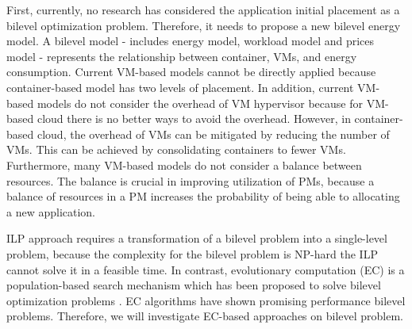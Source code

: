 First, currently, no research has considered the application initial placement as a bilevel optimization problem. Therefore, it needs to propose a new bilevel energy model. A bilevel model - includes energy model, workload model and prices model - represents the relationship between container, VMs, and energy consumption. Current VM-based models cannot be directly applied because container-based model has two levels of placement. In addition, current VM-based models do not consider the overhead of VM hypervisor because for VM-based cloud there is no better ways to avoid the overhead. However, in container-based cloud, the overhead of VMs can be mitigated by reducing the number of VMs. This can be achieved by consolidating containers to fewer VMs. Furthermore, many VM-based models do not consider a balance between resources. The balance is crucial \cite{Tomas:2013iv} in improving utilization of PMs, because a balance of resources in a PM increases the probability of being able to allocating a new application.

 ILP approach requires a transformation of a bilevel problem into a single-level problem, because the complexity for the bilevel problem is NP-hard \cite{Sinha:2013tn} the ILP cannot solve it in a feasible time. In contrast, evolutionary computation (EC) is a population-based search mechanism which has been proposed to solve bilevel optimization problems \cite{Wang:2008kb, Wang:2011di, Angelo:2013ee}. EC algorithms have shown promising performance bilevel problems. Therefore, we will investigate EC-based approaches on bilevel problem.



